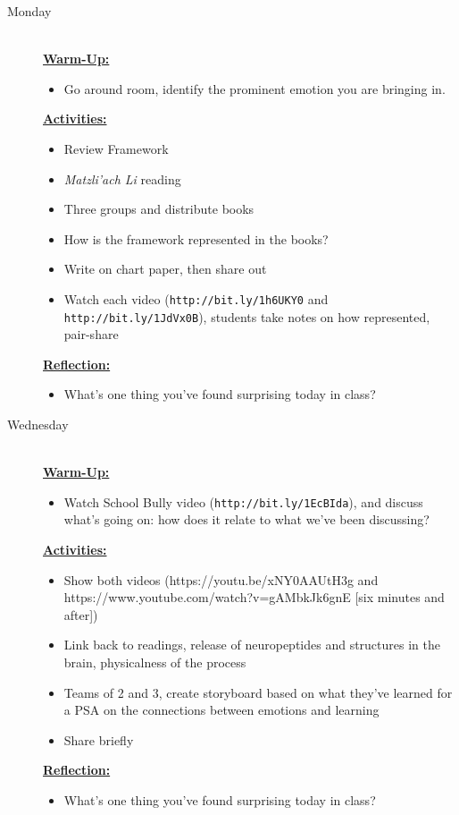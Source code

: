 \documentclass{article}
\newcommand{\url}[1]{\footnotesize\texttt{#1}\normalsize}
\newcommand{\listmon}{\item[\large\textsf{Monday}\normalsize] \hfill \\}
\newcommand{\listwed}{\item[\large\textsf{Wednesday}\normalsize] \hfill \\}
\newenvironment{daywu}
	{\underline{\textbf{Warm-Up:}} \hfill \\
	\begin{itemize}}
	{\end{itemize}}
\newenvironment{dayact}
	{\underline{\textbf{Activities:}} \hfill \\
	\begin{itemize}}
	{\end{itemize}}
\newenvironment{dayref}
	{\underline{\textbf{Reflection:}} \hfill \\
	\begin{itemize}}
	{\end{itemize}}
\newenvironment{weeksched}
	{\noindent
	\begin{description}}
	{\end{description}
	\newpage}
\begin{document}
\begin{weeksched}

\listmon
\begin{daywu}
	\item Go around room, identify the prominent emotion you are bringing in.
\end{daywu}
\begin{dayact}
	\item Review Framework
	\item \textit{Matzli'ach Li} reading
	\item Three groups and distribute books
	\item How is the framework represented in the books?
	\item Write on chart paper, then share out
	\item Watch each video (\url{http://bit.ly/1h6UKY0} and \url{http://bit.ly/1JdVx0B}), students take notes on how represented, pair-share
\end{dayact}
\begin{dayref}
	\item What's one thing you've found surprising today in class?
\end{dayref}

\listwed
\begin{daywu}
	\item Watch School Bully video (\url{http://bit.ly/1EcBIda}), and discuss what's going on: how does it relate to what we've been discussing?
\end{daywu}
\begin{dayact}
	\item Show both videos (https://youtu.be/xNY0AAUtH3g and https://www.youtube.com/watch?v=gAMbkJk6gnE [six minutes and after])
	\item Link back to readings, release of neuropeptides and structures in the brain, physicalness of the process
	\item Teams of 2 and 3, create storyboard based on what they've learned for a PSA on the connections between emotions and learning
	\item Share briefly
\end{dayact}
\begin{dayref}
	\item What's one thing you've found surprising today in class?
\end{dayref}
\end{weeksched}
\end{document}
